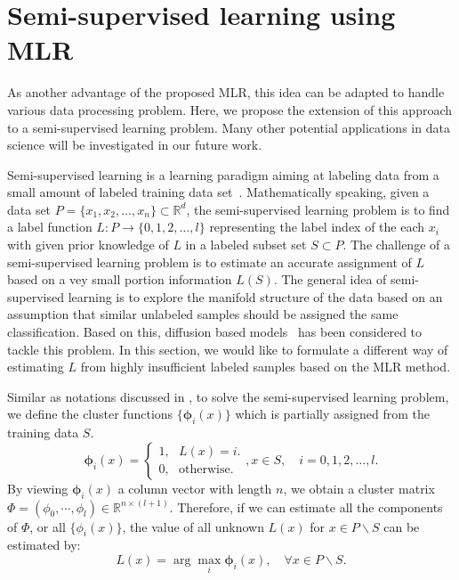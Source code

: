 \documentclass[letterpaper,10pt]{article}
\newcommand{\R}{\mathbb{R}}
\begin{document}
\section{Semi-supervised learning using MLR}
\label{sec:SemiSuperLearning}
As another advantage of the proposed MLR, this idea can be adapted to handle various data processing problem. Here, we propose the extension of this approach to a semi-supervised learning problem. Many other potential applications in data science will be investigated in our future work.

Semi-supervised learning is a learning paradigm aiming at labeling data from a small amount of labeled training data set~\cite{zhu2009introduction}. Mathematically speaking, given a data set $P = \{x_1,x_2,\ldots,x_n\} \subset \mathbb{R}^{d}$, the semi-supervised learning problem is to find a label function $L: P\rightarrow \{0, 1,2,\ldots,l\}$ representing the label index of the each $x_i$ with given prior knowledge of $L$ in a labeled subset set $S \subset P$. The challenge of a semi-supervised learning problem is to estimate an accurate assignment of $L$ based on a vey small portion information $L(S)$. The general idea of semi-supervised learning is to explore the manifold structure of the data based on an assumption that similar unlabeled samples should be assigned the same classification. Based on this, diffusion based models~\cite{zhu2003semi,shi1509harmonic,shi2016weighted} has been considered to tackle this problem. In this section, we would like to formulate a different way of estimating $L$ from highly insufficient labeled samples based on the MLR method.


Similar as notations discussed in \cite{zhu2003semi,shi1509harmonic,shi2016weighted}, to solve the semi-supervised learning problem, we define the cluster functions $\{\bm{\phi}_i(x)\}$ which is partially assigned from the training data $S$.
$$\bm{\phi}_i(x)= \begin{cases}1, \ \ \ L(x) = i. \\0, \ \ \ \text{otherwise}. \end{cases}, x \in S,\quad  i =0, 1,2,\ldots,l.$$
By viewing $\bm{\phi}_i(x)$ a column vector with length $n$, we obtain a cluster matrix $\Phi = (\phi_0,\cdots,\phi_l) \in \R^{n \times (l+1)}$. Therefore, if we can estimate all the components of $\Phi$, or all $\{\phi_i(x)\}$, the value of all unknown $L(x)$ for $x \in P\backslash S$ can be estimated by:
$$L(x)=\arg\max_i \bm{\phi}_{i}(x), \quad \forall x \in P \backslash S.$$
\end{document}
